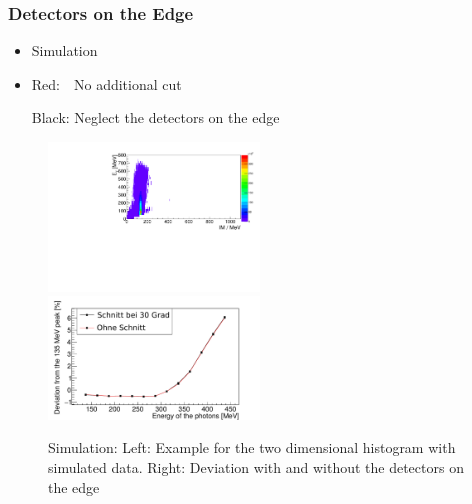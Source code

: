 \documentclass[slidestop,compress,mathserif]{beamer}
\begin{document}
\begin{frame}
	\frametitle{Detectors on the Edge}
	\begin{itemize}
	
	\item Simulation
	\item Red:\, \, No additional cut
	
	Black: Neglect the detectors on the edge
		
	\end{itemize}

\begin{figure}
	
	\includegraphics[width=0.50\textwidth]{Pictures/20171904SimNoCut2DHist}
	\hfill
	\includegraphics[width=0.50\textwidth]{Pictures/20172804MCBothDeviation}
	\caption{Simulation: Left: Example for the two dimensional histogram with simulated data. Right: Deviation with and without the detectors on the edge}
\end{figure}	
	
\end{frame}
\end{document}
